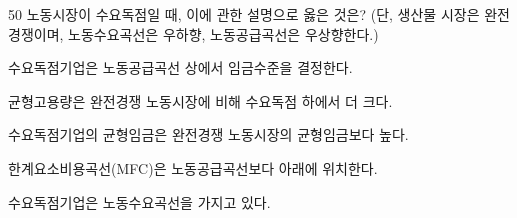\begin{question}{50}
노동시장이 수요독점일 때, 이에 관한 설명으로 옳은 것은? (단, 생산물 시장은 완전경쟁이며, 노동수요곡선은 우하향, 노동공급곡선은 우상향한다.)
\begin{choices}
  \item 수요독점기업은 노동공급곡선 상에서 임금수준을 결정한다.
  \item 균형고용량은 완전경쟁 노동시장에 비해 수요독점 하에서 더 크다.
  \item 수요독점기업의 균형임금은 완전경쟁 노동시장의 균형임금보다 높다.
  \item 한계요소비용곡선(MFC)은 노동공급곡선보다 아래에 위치한다.
  \item 수요독점기업은 노동수요곡선을 가지고 있다.
\end{choices}
\end{question}
